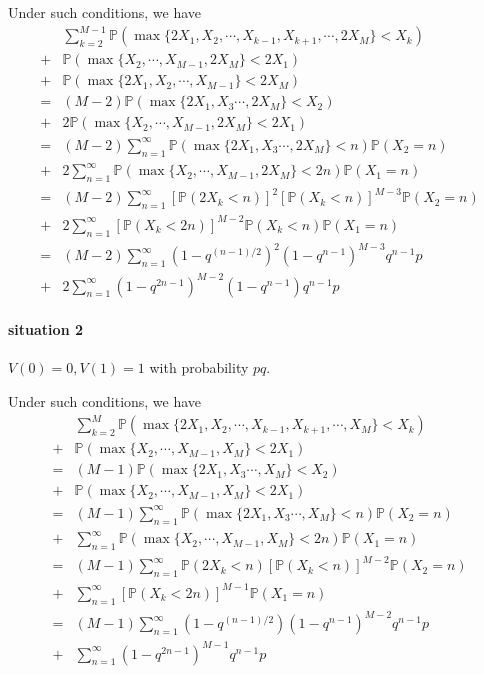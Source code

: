 \documentclass[12pt,a4paper]{article}
\begin{document}
\begin{appendices}
Under such conditions, we have
\begin{align*}
  & \sum_{k=2}^{M-1} \mathbb{P}(\max\{2 X_1, X_2, \cdots, X_{k-1}, X_{k+1}, \cdots, 2 X_{M}\} < X_k) \\
+ & \mathbb{P}(\max\{X_2, \cdots, X_{M-1}, 2 X_M\} < 2 X_1) \\
+ & \mathbb{P}(\max\{2 X_1, X_2, \cdots, X_{M-1}\} < 2 X_M) \\
= & (M-2) \mathbb{P}(\max\{2 X_1, X_3 \cdots, 2 X_{M}\} < X_2) \\
+ & 2 \mathbb{P}(\max\{X_2, \cdots, X_{M-1}, 2 X_M\} < 2 X_1) \\
= & (M-2) \sum_{n=1}^{\infty} \mathbb{P}(\max\{2 X_1, X_3 \cdots, 2 X_{M}\} < n) \mathbb{P}(X_2 = n) \\
+ & 2 \sum_{n=1}^{\infty} \mathbb{P}(\max\{X_2, \cdots, X_{M-1}, 2 X_M\} < 2 n) \mathbb{P}(X_1 = n) \\
= & (M-2) \sum_{n=1}^{\infty} [\mathbb{P}(2 X_k < n)]^2 [\mathbb{P}(X_k < n)]^{M-3} \mathbb{P}(X_2 = n) \\
+ & 2 \sum_{n=1}^{\infty} [\mathbb{P}(X_k < 2 n)]^{M-2} \mathbb{P}(X_k < n) \mathbb{P}(X_1 = n) \\
= & (M-2) \sum_{n=1}^{\infty} (1 - q^{(n-1)/2})^2 (1 - q^{n-1})^{M-3} q^{n-1} p \\
+ & 2 \sum_{n=1}^{\infty} (1 - q^{2n-1})^{M-2} (1 - q^{n-1}) q^{n-1} p
\end{align*}

\paragraph*{situation 2}
$V(0) = 0, V(1) = 1$ with probability $p q$.

Under such conditions, we have
\begin{align*}
  & \sum_{k=2}^{M} \mathbb{P}(\max\{2 X_1, X_2, \cdots, X_{k-1}, X_{k+1}, \cdots, X_{M}\} < X_k) \\
+ & \mathbb{P}(\max\{X_2, \cdots, X_{M-1}, X_M\} < 2 X_1) \\
= & (M-1) \mathbb{P}(\max\{2 X_1, X_3 \cdots, X_{M}\} < X_2) \\
+ & \mathbb{P}(\max\{X_2, \cdots, X_{M-1}, X_M\} < 2 X_1) \\
= & (M-1) \sum_{n=1}^{\infty} \mathbb{P}(\max\{2 X_1, X_3 \cdots, X_{M}\} < n) \mathbb{P}(X_2 = n) \\
+ & \sum_{n=1}^{\infty} \mathbb{P}(\max\{X_2, \cdots, X_{M-1}, X_M\} < 2 n) \mathbb{P}(X_1 = n) \\
= & (M-1) \sum_{n=1}^{\infty} \mathbb{P}(2 X_k < n) [\mathbb{P}(X_k < n)]^{M-2} \mathbb{P}(X_2 = n) \\
+ & \sum_{n=1}^{\infty} [\mathbb{P}(X_k < 2 n)]^{M-1} \mathbb{P}(X_1 = n) \\
= & (M-1) \sum_{n=1}^{\infty} (1 - q^{(n-1)/2}) (1 - q^{n-1})^{M-2} q^{n-1} p \\
+ & \sum_{n=1}^{\infty} (1 - q^{2n-1})^{M-1} q^{n-1} p
\end{align*}


\end{appendices}
\end{document}
